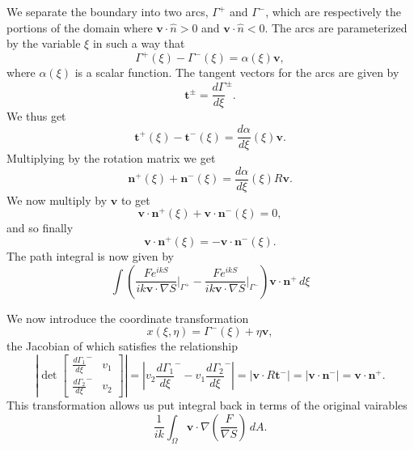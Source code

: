 \documentclass{article}
\newcommand{\abs}[1]{\left\lvert#1\right\rvert}
\theoremstyle{plain}
\begin{document}
We separate the boundary into two arcs, $\Gamma^+$ and $\Gamma^-$,
which are respectively the portions of the domain where $\mathbf{v}\cdot\hat{n} > 0$ and $\mathbf{v}\cdot\hat{n} < 0$.
The arcs are parameterized by the variable $\xi$ in such a way that
\begin{equation}
	\Gamma^+(\xi) - \Gamma^-(\xi) = \alpha(\xi)\mathbf{v},
\end{equation}
where $\alpha(\xi)$ is a scalar function.
The tangent vectors for the arcs are given by
\begin{equation}
	\mathbf{t}^\pm = \frac{d\Gamma}{d\xi}^\pm.
\end{equation}
We thus get
\begin{equation}
	\mathbf{t}^+(\xi) - \mathbf{t}^-(\xi) = \frac{d\alpha}{d\xi}(\xi)\mathbf{v}.
\end{equation}
Multiplying by the rotation matrix we get
\begin{equation}
	\mathbf{n}^+(\xi) + \mathbf{n}^-(\xi) = \frac{d\alpha}{d\xi}(\xi)R\mathbf{v}.
\end{equation}
We now multiply by $\mathbf{v}$ to get
\begin{equation}
	\mathbf{v}\cdot\mathbf{n}^+(\xi) + \mathbf{v}\cdot\mathbf{n}^-(\xi) = 0,
\end{equation}
and so finally
\begin{equation}
	\mathbf{v}\cdot\mathbf{n}^+(\xi) = -\mathbf{v}\cdot\mathbf{n}^-(\xi).
\end{equation}
The path integral is now given by
\begin{equation}
	 \int \left( \frac{Fe^{ikS}}{ik\mathbf{v}\cdot\nabla S}\rvert_{\Gamma^+}
	 - \frac{Fe^{ikS}}{ik\mathbf{v}\cdot\nabla S}\rvert_{\Gamma^-} \right)\mathbf{v}\cdot\mathbf{n}^+ \,d\xi
\end{equation}

We now introduce the coordinate transformation
\begin{equation}
	x(\xi,\eta) = \Gamma^-(\xi) + \eta\mathbf{v},
\end{equation}
the Jacobian of which satisfies the relationship
\begin{equation}
	\abs{ \det
	\begin{bmatrix}
		\frac{d\Gamma_1}{d\xi}^- & v_1 \\
		\frac{d\Gamma_2}{d\xi}^- & v_2 
	\end{bmatrix}}
	= \abs{ v_2\frac{d\Gamma_1}{d\xi}^- - v_1\frac{d\Gamma_2}{d\xi}^- }
	= \abs{ \mathbf{v}\cdot R\mathbf{t}^- }
	= \abs{ \mathbf{v}\cdot\mathbf{n}^- }
	= \mathbf{v}\cdot\mathbf{n}^+.
\end{equation}
This transformation allows us put integral back in terms of the original vairables
\begin{equation}
	\frac{1}{ik} \int_\Omega \mathbf{v}\cdot\nabla\left(\frac{F}{\nabla S}\right) \,dA.
\end{equation}
\end{document}
